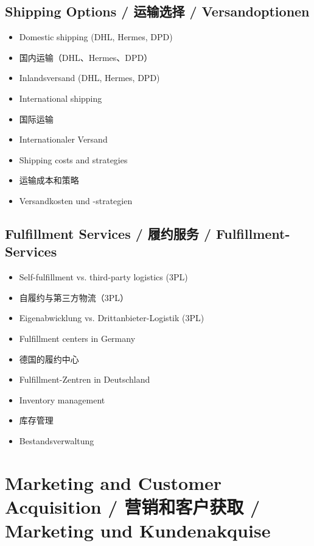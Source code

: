 \subsection{Shipping Options / 运输选择 / Versandoptionen}
\begin{itemize}
    \item Domestic shipping (DHL, Hermes, DPD)
    \item 国内运输（DHL、Hermes、DPD）
    \item Inlandsversand (DHL, Hermes, DPD)
    \item International shipping
    \item 国际运输
    \item Internationaler Versand
    \item Shipping costs and strategies
    \item 运输成本和策略
    \item Versandkosten und -strategien
\end{itemize}

\subsection{Fulfillment Services / 履约服务 / Fulfillment-Services}
\begin{itemize}
    \item Self-fulfillment vs. third-party logistics (3PL)
    \item 自履约与第三方物流（3PL）
    \item Eigenabwicklung vs. Drittanbieter-Logistik (3PL)
    \item Fulfillment centers in Germany
    \item 德国的履约中心
    \item Fulfillment-Zentren in Deutschland
    \item Inventory management
    \item 库存管理
    \item Bestandsverwaltung
\end{itemize}

\section{Marketing and Customer Acquisition / 营销和客户获取 / Marketing und Kundenakquise}

